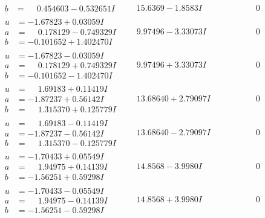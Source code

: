 \documentclass[1p]{elsarticle_modified}
\theoremstyle{definition}
\begin{document}
$$\begin{array}{c|c|c}
\begin{aligned}
b &= \phantom{-}0.454603 - 0.532651 I\end{aligned}
 & \phantom{-}15.6369 - 1.8583 I & \phantom{-0.000000 } 0 \\ \hline\begin{aligned}
u &= -1.67823 + 0.03059 I \\
a &= \phantom{-}0.178129 - 0.749329 I \\
b &= -0.101652 + 1.402470 I\end{aligned}
 & \phantom{-}9.97496 - 3.33073 I & \phantom{-0.000000 } 0 \\ \hline\begin{aligned}
u &= -1.67823 - 0.03059 I \\
a &= \phantom{-}0.178129 + 0.749329 I \\
b &= -0.101652 - 1.402470 I\end{aligned}
 & \phantom{-}9.97496 + 3.33073 I & \phantom{-0.000000 } 0 \\ \hline\begin{aligned}
u &= \phantom{-}1.69183 + 0.11419 I \\
a &= -1.87237 + 0.56142 I \\
b &= \phantom{-}1.315370 + 0.125779 I\end{aligned}
 & \phantom{-}13.68640 + 2.79097 I & \phantom{-0.000000 } 0 \\ \hline\begin{aligned}
u &= \phantom{-}1.69183 - 0.11419 I \\
a &= -1.87237 - 0.56142 I \\
b &= \phantom{-}1.315370 - 0.125779 I\end{aligned}
 & \phantom{-}13.68640 - 2.79097 I & \phantom{-0.000000 } 0 \\ \hline\begin{aligned}
u &= -1.70433 + 0.05549 I \\
a &= \phantom{-}1.94975 + 0.14139 I \\
b &= -1.56251 + 0.59298 I\end{aligned}
 & \phantom{-}14.8568 - 3.9980 I & \phantom{-0.000000 } 0 \\ \hline\begin{aligned}
u &= -1.70433 - 0.05549 I \\
a &= \phantom{-}1.94975 - 0.14139 I \\
b &= -1.56251 - 0.59298 I\end{aligned}
 & \phantom{-}14.8568 + 3.9980 I & \phantom{-0.000000 } 0 \\ \hline\begin{aligned}

\end{aligned}
\end{array}$$
\end{document}
